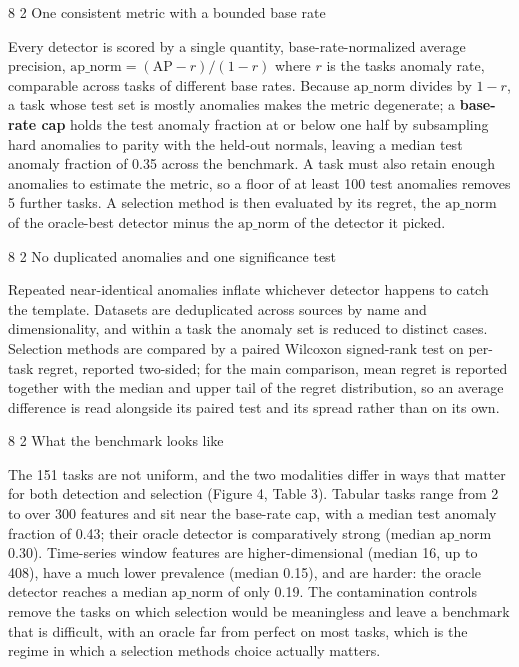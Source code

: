 \documentclass[3p,twocolumn]{elsarticle}
\makeatletter
\renewcommand\subsection{\@startsection{subsection}{2}{\z@}%
           {8\p@ \@plus 4\p@ \@minus 4\p@}%
           {2\p@ \@plus 4\p@ \@minus 3\p@}%
           {\normalfont\normalsize\itshape}}
\makeatother
\begin{document}
\subsection{One consistent metric with a bounded base rate}\label{34-one-consistent-metric-with-a-bounded-base-rate}

Every detector is scored by a single quantity, base-rate-normalized average precision, \(\mathrm{ap\_norm} = (\mathrm{AP} - r)/(1 - r)\) where \(r\) is the task\textquotesingle s anomaly rate, comparable across tasks of different base rates. Because \(\mathrm{ap\_norm}\) divides by \(1-r\), a task whose test set is mostly anomalies makes the metric degenerate; a \textbf{base-rate cap} holds the test anomaly fraction at or below one half by subsampling hard anomalies to parity with the held-out normals, leaving a median test anomaly fraction of 0.35 across the benchmark. A task must also retain enough anomalies to estimate the metric, so a floor of at least 100 test anomalies removes 5 further tasks. A selection method is then evaluated by its regret, the \(\mathrm{ap\_norm}\) of the oracle-best detector minus the \(\mathrm{ap\_norm}\) of the detector it picked.

\subsection{No duplicated anomalies and one significance test}\label{35-no-duplicated-anomalies-and-one-significance-test}

Repeated near-identical anomalies inflate whichever detector happens to catch the template. Datasets are deduplicated across sources by name and dimensionality, and within a task the anomaly set is reduced to distinct cases. Selection methods are compared by a paired Wilcoxon signed-rank test on per-task regret, reported two-sided; for the main comparison, mean regret is reported together with the median and upper tail of the regret distribution, so an average difference is read alongside its paired test and its spread rather than on its own.

\subsection{What the benchmark looks like}\label{36-what-the-benchmark-looks-like}

The 151 tasks are not uniform, and the two modalities differ in ways that matter for both detection and selection (Figure 4, Table 3). Tabular tasks range from 2 to over 300 features and sit near the base-rate cap, with a median test anomaly fraction of 0.43; their oracle detector is comparatively strong (median \(\mathrm{ap\_norm}\) 0.30). Time-series window features are higher-dimensional (median 16, up to 408), have a much lower prevalence (median 0.15), and are harder: the oracle detector reaches a median \(\mathrm{ap\_norm}\) of only 0.19. The contamination controls remove the tasks on which selection would be meaningless and leave a benchmark that is difficult, with an oracle far from perfect on most tasks, which is the regime in which a selection method\textquotesingle s choice actually matters.
\end{document}
